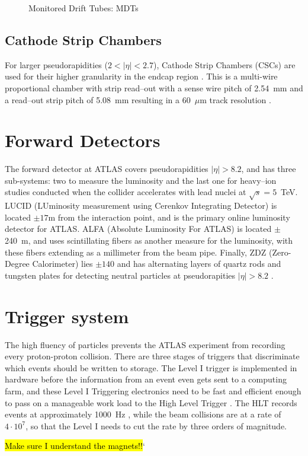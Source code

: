 \begin{figure}[h!tbp]
	\centering
\caption{Monitored Drift Tubes: MDTs}
\end{figure}

\subsection{Cathode Strip Chambers}
\label{cdc}
For larger pseudorapidities ($2 < |\eta| < 2.7$), Cathode Strip Chambers (CSCs) are used for their higher granularity in the endcap region \cite{ATLAS_long}.  This is a multi-wire proportional chamber with strip read--out with a sense wire pitch of 2.54~mm and a read--out strip pitch of 5.08~mm resulting in a 60~$\mu$m track resolution \cite{ATLAS_long}.  

\section{Forward Detectors}
The forward detector at ATLAS covers pseudorapidities $|\eta| > 8.2$, and has three sub-systems: two to measure the luminosity and the last one for heavy--ion studies conducted when the collider accelerates with lead nuclei at $\sqrt{s}=5$~TeV.
LUCID (LUminosity measurement using Cerenkov Integrating Detector) is located $\pm 17$m from the interaction point, and is the primary online luminosity detector for ATLAS.
ALFA (Absolute Luminosity For ATLAS) is located $\pm$240~m, and uses scintillating fibers as another measure for the luminosity, with these fibers extending as a millimeter from the beam pipe.
Finally, ZDZ (Zero-Degree Calorimeter) lies $\pm 140$ and has alternating layers of quartz rods and tungsten plates for detecting neutral particles at pseudorapities $|\eta| > 8.2$ \cite{ATLAS_long}.

\section{Trigger system}


The high fluency of particles prevents the ATLAS experiment from recording every proton-proton collision.
There are three stages of triggers that discriminate which events should be written to storage.  
The Level I trigger is implemented in hardware before the information from an event even gets sent to a computing farm, and these Level I Triggering electronics need to be fast and efficient enough to pass on a manageable work load to the High Level Trigger \cite{ATLAS_long}.
The HLT records events at approximately 1000~Hz \cite{HLT}, while the beam collisions are at a rate of $4\cdot10^7$, so that the Level I needs to cut the rate by three orders of magnitude. 



\hl{Make sure I understand the magnets!!}`